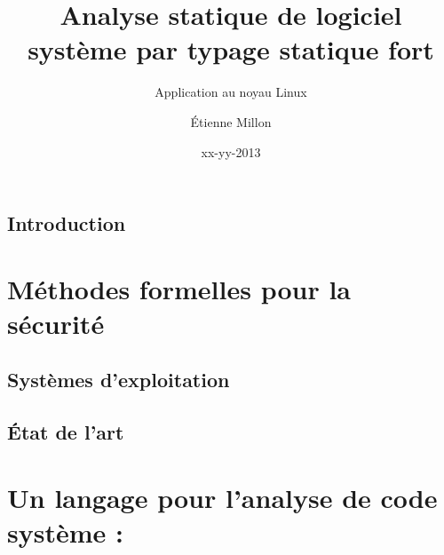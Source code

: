 \documentclass[a4paper,11pt]{memoir}
\title{Analyse statique de logiciel système par typage statique fort}
\subtitle{Application au noyau Linux}
\author{Étienne Millon}
\date{xx-yy-2013}
\begin{document}
\frontmatter

\begin{titlingpage}
\titleUL{}
\end{titlingpage}

\cleartorecto


%


%


\tableofcontents

\mainmatter

\chapter{Introduction}

\label{cha:intro}



\part{Méthodes formelles pour la sécurité}
\label{part:ctx}



\chapter{Systèmes d'exploitation}

\label{cha:os}



%

\chapter{État de l'art}

\label{cha:etatdelart}




\part{Un langage pour l'analyse de code système : \langname}
\label{part:lang}
\end{document}
